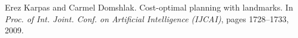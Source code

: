\begin{thebibliography}{10}
\footnotesize

Erez Karpas and Carmel Domshlak.
\newblock Cost-optimal planning with landmarks.
\newblock In {\em Proc. of Int. Joint. Conf. on Artificial Intelligence
({IJCAI})}, pages 1728--1733, 2009.
\end{thebibliography}
